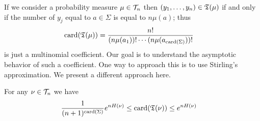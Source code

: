 If we consider a probability measure $\mu \in \mathcal{T}_{n}$ then $(y_1, \dotsc, y_n) \in \mathfrak{T}(\mu)$ if and only if the number of $y_j$ equal to $a \in \Sigma$ is equal to $n \mu(a)$; thus 
\begin{align*}
\operatorname*{card}(\mathfrak{T}(\mu)) &= \frac{n!}{(n \mu(a_1))! \dotsb (n \mu(a_{\operatorname*{card}(\Sigma)}))!}
\end{align*}
is just a multinomial coefficient.  Our goal is to understand the asymptotic behavior of such a coefficient.  One way to approach this is to use Stirling's approximation.  We present a different approach here.
\begin{lem}\label{SizeOfATypeClass}For any $\nu \in \mathcal{T}_{n}$ we have
\begin{align*}
\frac{1}{(n+1)^{\operatorname*{card}(\Sigma)}} e^{nH(\nu)} &\leq \operatorname*{card}(\mathfrak{T}(\nu)) \leq e^{nH(\nu)}
\end{align*}
\end{lem}
